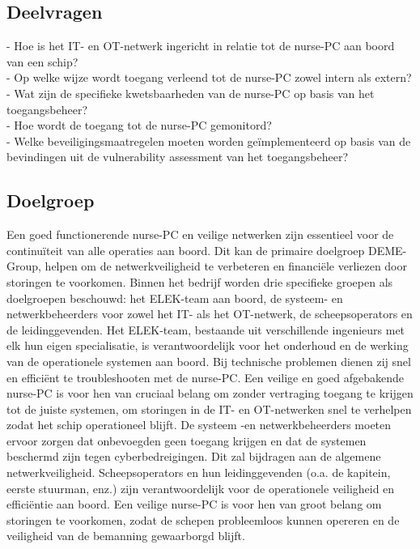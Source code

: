 \subsection{Deelvragen}
- Hoe is het IT- en OT-netwerk ingericht in relatie tot de nurse-PC aan boord van een schip? \\     
- Op welke wijze wordt toegang verleend tot de nurse-PC zowel intern als extern? \\    
- Wat zijn de specifieke kwetsbaarheden van de nurse-PC op basis van het toegangsbeheer? \\      
- Hoe wordt de toegang tot de nurse-PC gemonitord?  \\   
- Welke beveiligingsmaatregelen moeten worden geïmplementeerd op basis van de bevindingen uit de vulnerability assessment van het toegangsbeheer? \\

\subsection{Doelgroep}
Een goed functionerende nurse-PC en veilige netwerken zijn essentieel voor de continuïteit van alle operaties aan boord. 
Dit kan de primaire doelgroep DEME-Group, helpen om de netwerkveiligheid te verbeteren en financiële verliezen door storingen te voorkomen.
Binnen het bedrijf worden drie specifieke groepen als doelgroepen beschouwd: het ELEK-team aan boord, de systeem- en netwerkbeheerders voor zowel het IT- als het OT-netwerk, de scheepsoperators en de leidinggevenden.
Het ELEK-team, bestaande uit verschillende ingenieurs met elk hun eigen specialisatie, is verantwoordelijk voor het onderhoud en de werking van de operationele systemen aan boord. Bij technische problemen dienen zij snel en efficiënt te troubleshooten met de nurse-PC.  
Een veilige en goed afgebakende nurse-PC is voor hen van cruciaal belang om zonder vertraging toegang te krijgen tot de juiste systemen, om storingen in de IT- en OT-netwerken snel te verhelpen zodat het schip operationeel blijft.
De systeem -en netwerkbeheerders moeten ervoor zorgen dat onbevoegden geen toegang krijgen en dat de systemen beschermd zijn tegen cyberbedreigingen. Dit zal bijdragen aan de algemene netwerkveiligheid.
Scheepsoperators en hun leidinggevenden (o.a. de kapitein, eerste stuurman, enz.) zijn verantwoordelijk voor de operationele veiligheid en efficiëntie aan boord. Een veilige nurse-PC is voor hen van groot belang om storingen te voorkomen, 
zodat de schepen probleemloos kunnen opereren en de veiligheid van de bemanning gewaarborgd blijft.



